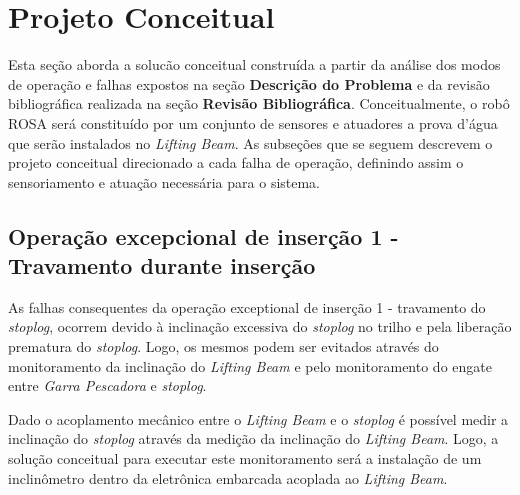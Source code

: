 



\chapter{Projeto Conceitual}
Esta seção aborda a solucão conceitual construída a partir da análise dos modos de operação e 
falhas expostos na seção {\bf Descrição do Problema} e da revisão bibliográfica realizada na 
seção {\bf Revisão Bibliográfica}. Conceitualmente, o robô ROSA será constituído por um conjunto de sensores e
atuadores a prova d'água que serão instalados no \emph{Lifting Beam}.
As subseções que se seguem descrevem o projeto conceitual direcionado a cada
falha de operação, definindo assim o sensoriamento e atuação necessária para o sistema. 



\section{Operação excepcional de inserção 1 - Travamento durante inserção}

As falhas consequentes da operação exceptional de inserção 1 - travamento do
\emph{stoplog}, ocorrem devido à inclinação excessiva do \emph{stoplog} no
trilho e pela liberação prematura do \emph{stoplog}. Logo, os mesmos podem ser evitados através do monitoramento da inclinação do \emph{Lifting Beam} e pelo monitoramento do engate entre \emph{Garra Pescadora} e  \emph{stoplog}.

Dado o acoplamento mecânico entre o \emph{Lifting Beam} e o \emph{stoplog} é
possível medir a inclinação do \emph{stoplog} através da medição da inclinação do \emph{Lifting Beam}. Logo, a solução conceitual para executar este monitoramento será a instalação de um inclinômetro dentro da eletrônica embarcada acoplada ao \emph{Lifting Beam}.


